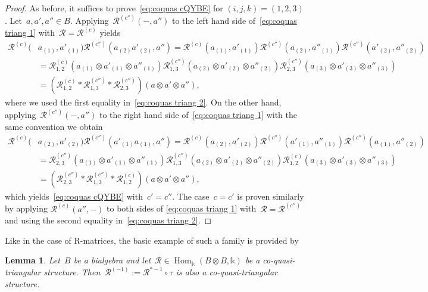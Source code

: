 \documentclass[12pt, reqno]{amsart}
\newtheorem{lemma}[theorem]{Lemma}
\theoremstyle{definition}
\numberwithin{equation}{section}
\newcommand{\tensor}{\otimes}
\newcommand{\kk}{\mathbb{k}}\newcommand{\lie}[1]{{\mathfrak{#1}}}
\DeclareMathOperator{\Hom}{Hom}
\begin{document}
\begin{proof}
As before, it suffices to prove~\eqref{eq:coquas cQYBE} for $(i,j,k)=(1,2,3)$.
Let~$a,a',a''\in B$.
Applying~$\mathcal R^{(c'')}(-,a'')$
to the left hand side of~\eqref{eq:coquas triang 1} 
with~$\mathcal R=\mathcal R^{(c)}$ yields 
\begin{align*}
\mathcal R^{(c)}(&a_{(1)},a'_{(1)})\mathcal R^{(c'')}(a_{(2)}a'_{(2)},a'')=
\mathcal R^{(c)}(a_{(1)},a'_{(1)})\mathcal R^{(c'')}(a_{(2)},a''_{(1)})\mathcal R^{(c'')}(a'_{(2)},a''_{(2)})
\\
&=\mathcal R_{1,2}^{(c)}(a_{(1)}\tensor a'_{(1)}\tensor a''_{(1)})
\mathcal R_{1,3}^{(c'')}(a_{(2)}\tensor a'_{(2)}\tensor a''_{(2)})\mathcal R_{2,3}^{(c'')}(a_{(3)}\tensor a'_{(3)}\tensor a''_{(3)})
\\
&=(\mathcal R_{1,2}^{(c)}\ast \mathcal R_{1,3}^{(c'')}\ast 
\mathcal R_{2,3}^{(c'')})(a\tensor a'\tensor a''),
\end{align*}
where we used the first equality in~\eqref{eq:coquas triang 2}. 
On the other hand, applying~$\mathcal R^{(c'')}(-,a'')$
to the right hand side of~\eqref{eq:coquas triang 1}
with the same convention
we obtain 
\begin{align*}
\mathcal R^{(c)}(&a_{(2)},a'_{(2)})\mathcal R^{(c'')}(a'_{(1)}a_{(1)},a'')=\mathcal R^{(c)}(a_{(2)},a'_{(2)})\mathcal R^{(c'')}(a'_{(1)},a''_{(1)})\mathcal R^{(c'')}(a_{(1)},a''_{(2)})
\\
&=\mathcal R_{2,3}^{(c'')}(a_{(1)}\tensor a'_{(1)}\tensor a''_{(1)})\mathcal R_{1,3}^{(c'')}(a_{(2)}\tensor a'_{(2)}\tensor a''_{(2)})
\mathcal R_{1,2}^{(c)}(a_{(3)}\tensor a'_{(3)}\tensor a''_{(3)})\\
&=(\mathcal R_{2,3}^{(c'')}\ast\mathcal R_{1,3}^{(c'')}
\ast\mathcal R_{1,2}^{(c)})(a\tensor a'\tensor a''),
\end{align*}
which yields~\eqref{eq:coquas cQYBE} with~$c'=c''$. The
case~$c=c'$ is proven similarly
by applying $\mathcal R^{(c)}(a'',-)$ to both sides of \eqref{eq:coquas triang 1} with~$\mathcal R=\mathcal R^{(c'')}$ and using
the second equality in~\eqref{eq:coquas triang 2}.
\end{proof}
Like in the case of R-matrices, the basic example of such a family is provided by
\begin{lemma}\label{lem:basic coquas family}
Let~$B$ be a bialgebra and let~$\mathcal R\in\Hom_\kk(B\tensor B,\kk)$ be a co-quasi-triangular
structure. Then~$\mathcal R^{(-1)}:=\mathcal R^{\ast-1}\circ\tau$ is
also a co-quasi-triangular structure.
\end{lemma}
\end{document}

